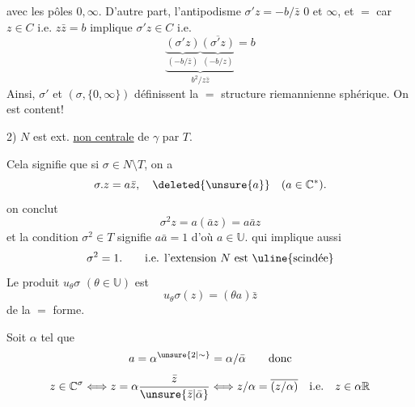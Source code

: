 avec les pôles $0,\infty$. D'autre part, l'antipodisme $\sigma'z=-b/\bar z$  $0$ et $\infty$, et  $=$ car $z\in C$ i.e. $z\bar z=b$ implique $\sigma'z\in C$ i.e.
\[
\underbrace{\underbrace{(\sigma'z)}_{(-b/\bar z)}\underbrace{\overline{(\sigma'z)}}_{(-b/z)}}_{b^2/z\bar z}=b
\]
Ainsi, $\sigma'$ et $(\sigma,\{0,\infty\})$ définissent la $=$ structure riemannienne sphérique. On est content!

2) $N$ est ext. \uline{non centrale} de $\gamma$ par $T$.

Cela signifie que si $\sigma\in N\setminus T$, on a
\[
\sigma.z=a\bar z,\quad\deleted{\unsure{a}}\quad(a\in\mathbb C^*).
\]
 on conclut
\[
\sigma^2z=a(\bar a z)=a\bar a z
\]
et la condition $\sigma^2\in T$ signifie $a\bar a=1$ d'où $a\in\mathbb U$. qui implique aussi 
\[
\sigma^2=1.\qquad\text{i.e. l'extension }N\text{ est \uline{scindée}}
\]
Le produit $u_\theta\sigma$ $(\theta\in\mathbb U)$ est
\[
u_\theta\sigma(z)=(\theta a)\bar z
\]
de la $=$ forme.

Soit $\alpha$ tel que
\[
a=\alpha^{\unsure{2|\sim}}=\alpha/\bar\alpha\qquad\text{donc}
\]
\[
z\in\mathbb C^\sigma\Longleftrightarrow z=\alpha\frac{\bar z}{\unsure{\bar z|\bar\alpha}}\Longleftrightarrow z/\alpha=\overline{(z/\alpha)}\quad\text{i.e.}\quad z\in\alpha\mathbb R
\]

